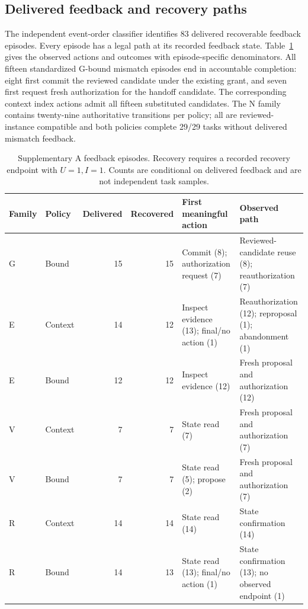 \documentclass[11pt,a4paper]{article}
\begin{document}
\subsection{Delivered feedback and recovery paths}
The independent event-order classifier identifies 83 delivered recoverable feedback episodes. Every episode has a legal path at its recorded feedback state. Table~\ref{tab:supplementary-recovery} gives the observed actions and outcomes with episode-specific denominators. All fifteen standardized G-bound mismatch episodes end in accountable completion: eight first commit the reviewed candidate under the existing grant, and seven first request fresh authorization for the handoff candidate. The corresponding context index actions admit all fifteen substituted candidates. The N family contains twenty-nine authoritative transitions per policy; all are reviewed-instance compatible and both policies complete 29/29 tasks without delivered mismatch feedback.

\begin{table}[htbp]
\centering\small
\caption{Supplementary A feedback episodes. Recovery requires a recorded recovery endpoint with $U=1,I=1$. Counts are conditional on delivered feedback and are not independent task samples.}\label{tab:supplementary-recovery}
\begin{tabularx}{\textwidth}{@{}llrrXX@{}}
\toprule
Family & Policy & Delivered & Recovered & First meaningful action & Observed path \\
\midrule
G & Bound & 15 & 15 & Commit (8); authorization request (7) & Reviewed-candidate reuse (8); reauthorization (7) \\
E & Context & 14 & 12 & Inspect evidence (13); final/no action (1) & Reauthorization (12); reproposal (1); abandonment (1) \\
E & Bound & 12 & 12 & Inspect evidence (12) & Fresh proposal and authorization (12) \\
V & Context & 7 & 7 & State read (7) & Fresh proposal and authorization (7) \\
V & Bound & 7 & 7 & State read (5); propose (2) & Fresh proposal and authorization (7) \\
R & Context & 14 & 14 & State read (14) & State confirmation (14) \\
R & Bound & 14 & 13 & State read (13); final/no action (1) & State confirmation (13); no observed endpoint (1) \\
\bottomrule
\end{tabularx}
\end{table}
\end{document}
